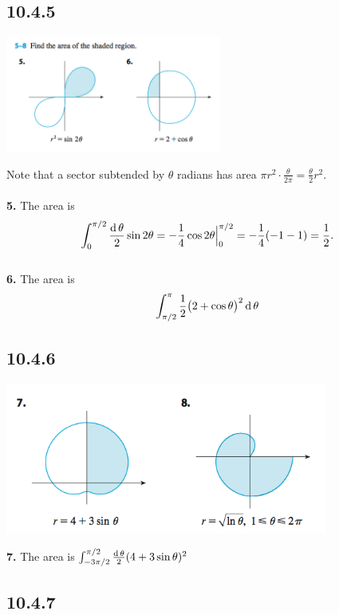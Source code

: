 \documentclass[12pt]{article}
\begin{document}
\subsection*{10.4.5}
\includegraphics[width=200pt]{img/10-4-5-6.png}
\begin{mdframed}
  Note that a sector subtended by $\theta$ radians has area
  $\pi r^2 \cdot \frac{\theta}{2\pi} = \frac{\theta}{2}r^2$.\\\\
  \textbf{5.} The area is
  \begin{align*}
    \int_0^{\pi/2} \frac{\operatorname{\text{d}}\theta}{2}\sin2\theta = -\frac{1}{4}\cos2\theta\Big|_0^{\pi/2} = -\frac{1}{4}(-1 - 1) = \frac{1}{2}.
  \end{align*}\\
  \textbf{6.} The area is
  \begin{align*}
    \int_{\pi/2}^\pi \frac{1}{2}\big(2 + \cos\theta\big)^2 \operatorname{\text{d}}\theta\\
  \end{align*}
\end{mdframed}

\subsection*{10.4.6}
\includegraphics[width=300pt]{img/10-4-7-8.png}
\begin{mdframed}
  \textbf{7.} The area is $\int_{-3\pi/2}^{\pi/2}\frac{\operatorname{\text{d}}\theta}{2}(4 + 3\sin\theta)^2$
\end{mdframed}

\subsection*{10.4.7}
\end{document}
